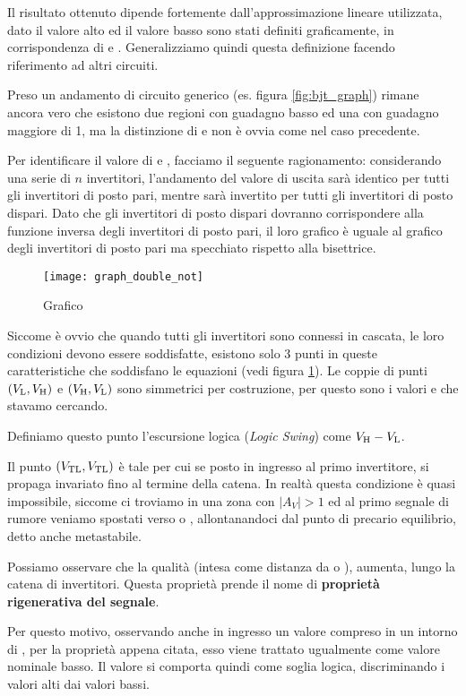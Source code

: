\documentclass[../template]{subfiles}
\begin{document}
Il risultato ottenuto dipende fortemente dall'approssimazione lineare utilizzata, dato il valore alto  ed il valore
basso  sono stati definiti graficamente, in corrispondenza di  e \vcesat.
Generalizziamo quindi questa definizione facendo riferimento ad altri circuiti.

Preso un andamento di circuito generico (es. figura \ref{fig:bjt_graph}) rimane ancora vero che esistono due regioni con
guadagno basso ed una con guadagno maggiore di 1, ma la distinzione di  e  non è ovvia come nel caso
precedente.


Per identificare il valore di \vl e \vh, facciamo il seguente ragionamento:
considerando una serie di $n$ invertitori, l'andamento del valore di uscita sarà identico per tutti gli invertitori di
posto pari, mentre sarà invertito per tutti gli invertitori di posto dispari.
Dato che gli invertitori di posto dispari dovranno corrispondere alla funzione inversa degli invertitori di posto pari,
il loro grafico è uguale al grafico degli invertitori di posto pari ma specchiato rispetto alla bisettrice.
\begin{figure}[h]
    \centering
    \texttt{[image: graph\_double\_not]}
    \caption{Grafico}
    \label{fig:graph_double_not}
\end{figure}

Siccome è ovvio che quando tutti gli invertitori sono connessi in cascata, le loro condizioni devono essere soddisfatte,
esistono solo 3 punti in queste caratteristiche che soddisfano le equazioni (vedi figura \ref{fig:graph_double_not}).
Le coppie di punti $(V_{\text{L}}, V_{\text{H}})$ e $(V_{\text{H}}, V_{\text{L}})$ sono simmetrici per costruzione, per questo sono i valori \vh e \vl che
stavamo cercando.

Definiamo questo punto l'escursione logica \ls (\textit{Logic Swing}) come $V_{\text{H}} - V_{\text{L}}$.

Il punto $(V_{\text{TL}}, V_{\text{TL}})$ è tale per cui se posto in ingresso al primo invertitore, si propaga invariato fino al termine
della catena. In realtà questa condizione è quasi impossibile, siccome ci troviamo in una zona con $|A_V| > 1$
ed al primo segnale di rumore veniamo spostati verso \vh o \vl, allontanandoci dal punto di precario equilibrio, detto
anche metastabile.

Possiamo osservare che la qualità (intesa come distanza da \vh o \vl), aumenta, lungo la catena di invertitori. Questa
proprietà prende il nome di \textbf{proprietà rigenerativa del segnale}.

Per questo motivo, osservando anche in ingresso un valore compreso in un intorno di \vl, per la proprietà appena citata,
esso viene trattato ugualmente come valore nominale basso. Il valore \vtl si comporta quindi come soglia logica,
discriminando i valori alti dai valori bassi.
\end{document}

